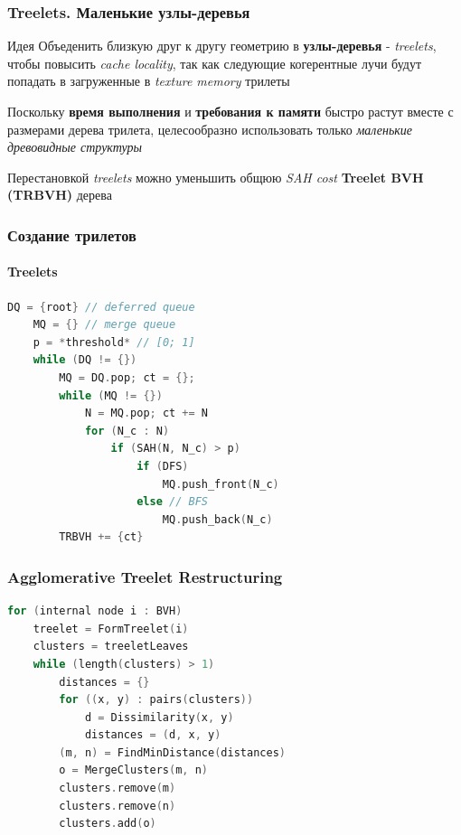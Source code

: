 \documentclass{beamer}
\begin{document}
\begin{frame}[t]
    \frametitle{Treelets. Маленькие узлы-деревья}

    \begin{block}{Идея}
        Объеденить близкую друг к другу геометрию в \textbf{узлы-деревья} - \textit{treelets}, чтобы повысить
        \textit{cache locality}, так как следующие когерентные лучи будут попадать в загруженные в \textit{texture memory} трилеты
    \end{block}
    \begin{block}{}
        Поскольку \textbf{время выполнения} и \textbf{требования к памяти} быстро растут вместе с размерами дерева трилета,
        целесообразно использовать только \textit{маленькие древовидные структуры}
    \end{block}
    Перестановкой \textit{treelets} можно уменьшить общюю \textit{SAH cost} \textbf{Treelet BVH (TRBVH)} дерева
\end{frame}

\begin{frame}[fragile]
    \frametitle{Создание трилетов}
    \framesubtitle{Treelets}
    \begin{lstlisting}[language=C++,basicstyle=\ttfamily,keywordstyle=\color{blue}]
    DQ = {root} // deferred queue
    MQ = {} // merge queue
    p = *threshold* // [0; 1]
    while (DQ != {})
        MQ = DQ.pop; ct = {};
        while (MQ != {})
            N = MQ.pop; ct += N
            for (N_c : N)
                if (SAH(N, N_c) > p)
                    if (DFS)
                        MQ.push_front(N_c)
                    else // BFS
                        MQ.push_back(N_c)
        TRBVH += {ct}
    \end{lstlisting}
\end{frame}

\begin{frame}[fragile]
    \frametitle{Agglomerative Treelet Restructuring}
    \begin{lstlisting}[language=C++,basicstyle=\ttfamily,keywordstyle=\color{blue}]
for (internal node i : BVH)
    treelet = FormTreelet(i)
    clusters = treeletLeaves
    while (length(clusters) > 1)
        distances = {}
        for ((x, y) : pairs(clusters))
            d = Dissimilarity(x, y)
            distances = (d, x, y)
        (m, n) = FindMinDistance(distances)
        o = MergeClusters(m, n)
        clusters.remove(m)
        clusters.remove(n)
        clusters.add(o)
    \end{lstlisting}
\end{frame}
\end{document}
